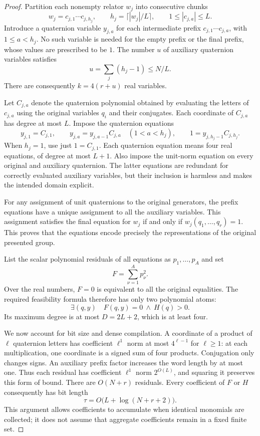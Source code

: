 \begin{proof}
Partition each nonempty relator $w_j$ into consecutive chunks
\[
 w_j=c_{j,1}\cdots c_{j,h_j},\qquad
 h_j=\lceil |w_j|/L\rceil,\qquad 1\leq |c_{j,a}|\leq L.
\]
Introduce a quaternion variable $y_{j,a}$ for each intermediate prefix
$c_{j,1}\cdots c_{j,a}$, with $1\leq a<h_j$.  No such variable is needed
for the empty prefix or the final prefix, whose values are prescribed to be
$1$.  The number $u$ of auxiliary quaternion variables satisfies
\[
 u=\sum_j(h_j-1)\leq N/L.
\]
There are consequently $k=4(r+u)$ real variables.

Let $C_{j,a}$ denote the quaternion polynomial obtained by evaluating the
letters of $c_{j,a}$ using the original variables $q_i$ and their
conjugates.  Each coordinate of $C_{j,a}$ has degree at most $L$.
Impose the quaternion equations
\[
 y_{j,1}=C_{j,1},\qquad
 y_{j,a}=y_{j,a-1}C_{j,a}\quad(1<a<h_j),\qquad
 1=y_{j,h_j-1}C_{j,h_j}.
\]
When $h_j=1$, use just $1=C_{j,1}$.  Each quaternion equation means four
real equations, of degree at most $L+1$.  Also impose the unit-norm equation
on every original and auxiliary quaternion.  The latter equations are
redundant for correctly evaluated auxiliary variables, but their inclusion
is harmless and makes the intended domain explicit.

For any assignment of unit quaternions to the original generators, the
prefix equations have a unique assignment to all the auxiliary variables.
This assignment satisfies the final equation for $w_j$ if and only if
$w_j(q_1,\ldots,q_r)=1$.  This proves that the equations encode precisely
the representations of the original presented group.

List the scalar polynomial residuals of all equations as
$p_1,\ldots,p_A$ and set
\[
 F=\sum_{\nu=1}^{A}p_\nu^2.
\]
Over the real numbers, $F=0$ is equivalent to all the original equalities.
The required feasibility formula therefore has only two polynomial atoms:
\begin{equation}
 \exists(q,y)\quad F(q,y)=0\ \wedge\ H(q)>0.
 \label{eq:su2-two-atoms}
\end{equation}
Its maximum degree is at most $D=2L+2$, which is at least four.

We now account for bit size and dense compilation.  A coordinate of a
product of $\ell$ quaternion letters has coefficient $\ell^1$ norm at
most $4^{\ell-1}$ for $\ell\geq1$: at each multiplication, one coordinate
is a signed sum of four products.  Conjugation only changes signs.
An auxiliary prefix factor increases the word length by at most one.
Thus each residual has coefficient $\ell^1$ norm $2^{O(L)}$, and squaring
it preserves this form of bound.  There are $O(N+r)$ residuals.  Every
coefficient of $F$ or $H$ consequently has bit length
\[
 \tau=O\bigl(L+\log(N+r+2)\bigr).
\]
This argument allows coefficients to accumulate when identical monomials
are collected; it does not assume that aggregate coefficients remain in a
fixed finite set.


\end{proof}
